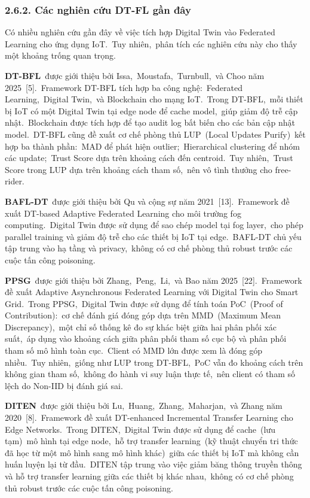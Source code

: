 \subsubsection{2.6.2. Các nghiên cứu DT-FL gần đây}\label{cuxe1c-nghiuxean-cux1ee9u-dt-fl-gux1ea7n-ux111uxe2y}

Có nhiều nghiên cứu gần đây về việc tích hợp Digital Twin vào Federated Learning cho ứng dụng IoT.~Tuy nhiên,~phân tích các nghiên cứu này cho thấy một khoảng trống quan trọng.

\textbf{DT-BFL}~được giới thiệu bởi Issa,~Moustafa,~Turnbull,~và Choo năm 2025~{[}5{]}.~Framework DT-BFL tích hợp ba công nghệ:~Federated Learning,~Digital Twin,~và Blockchain cho mạng IoT.~Trong DT-BFL,~mỗi thiết bị IoT có một Digital Twin tại edge node để cache model,~giúp giảm độ trễ cập nhật.~Blockchain được tích hợp để tạo audit log bất biến cho các bản cập nhật model.~DT-BFL cũng đề xuất cơ chế phòng thủ LUP~(Local Updates Purify)~kết hợp ba thành phần:~MAD để phát hiện outlier;~Hierarchical clustering để nhóm các update;~Trust Score dựa trên khoảng cách đến centroid.~Tuy nhiên,~Trust Score trong LUP dựa trên khoảng cách tham số,~nên vô tình thưởng cho free-rider.

\textbf{BAFL-DT}~được giới thiệu bởi Qu và cộng sự năm 2021~{[}13{]}.~Framework đề xuất DT-based Adaptive Federated Learning cho môi trường fog computing.~Digital Twin được sử dụng để sao chép model tại fog layer,~cho phép parallel training và giảm độ trễ cho các thiết bị IoT tại edge.~BAFL-DT chủ yếu tập trung vào hạ tầng và privacy,~không có cơ chế phòng thủ robust trước các cuộc tấn công poisoning.

\textbf{PPSG}~được giới thiệu bởi Zhang,~Peng,~Li,~và Bao năm 2025~{[}22{]}.~Framework đề xuất Adaptive Asynchronous Federated Learning với Digital Twin cho Smart Grid.~Trong PPSG,~Digital Twin được sử dụng để tính toán PoC~(Proof of Contribution):~cơ chế đánh giá đóng góp dựa trên MMD~(Maximum Mean Discrepancy),~một chỉ số thống kê đo sự khác biệt giữa hai phân phối xác suất,~áp dụng vào khoảng cách giữa phân phối tham số cục bộ và phân phối tham số mô hình toàn cục.~Client có MMD lớn được xem là đóng góp nhiều.~Tuy nhiên,~giống như LUP trong DT-BFL,~PoC vẫn đo khoảng cách trên không gian tham số,~không đo hành vi suy luận thực tế,~nên client có tham số lệch do Non-IID bị đánh giá sai.

\textbf{DITEN}~được giới thiệu bởi Lu,~Huang,~Zhang,~Maharjan,~và Zhang năm 2020~{[}8{]}.~Framework đề xuất DT-enhanced Incremental Transfer Learning cho Edge Networks.~Trong DITEN,~Digital Twin được sử dụng để cache~(lưu tạm)~mô hình tại edge node,~hỗ trợ transfer learning~(kỹ thuật chuyển tri thức đã học từ một mô hình sang mô hình khác)~giữa các thiết bị IoT mà không cần huấn luyện lại từ đầu.~DITEN tập trung vào việc giảm băng thông truyền thông và hỗ trợ transfer learning giữa các thiết bị khác nhau,~không có cơ chế phòng thủ robust trước các cuộc tấn công poisoning.

